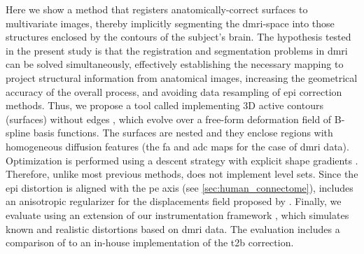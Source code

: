 Here we show a method that registers anatomically-correct surfaces to multivariate images,
  thereby implicitly segmenting the \gls*{dmri}-space into those structures enclosed by the contours
  of the subject's brain.
The hypothesis tested in the present study is that the registration and segmentation
  problems in \gls*{dmri} can be solved simultaneously, effectively establishing the
  necessary mapping to project structural information from anatomical images, increasing the
  geometrical accuracy of the overall process, and avoiding data resampling of \gls*{epi}
  correction methods.
Thus, we propose a tool called \regseg{} implementing 3D active contours (surfaces) without edges
  \citep{chan_active_2001}, which evolve over a free-form deformation field of B-spline
  basis functions.
The surfaces are nested and they enclose regions with homogeneous diffusion features
  (the \gls*{fa} and \gls*{adc} maps for the case of \gls*{dmri} data).
Optimization is performed using a descent strategy with explicit shape gradients
  \citep{besson_dream2s_2003,herbulot_segmentation_2006}.
Therefore, unlike most previous methods, \regseg{} does not implement level sets.
Since the \gls*{epi} distortion is aligned with the \gls*{pe} axis (see
  \autoref{sec:human_connectome}), \regseg{} includes an anisotropic regularizer for
  the displacements field proposed by \cite{nagel_investigation_1986}.
Finally, we evaluate \regseg{} using an extension of our instrumentation framework
  \citep{esteban_simulationbased_2014}, which simulates known and realistic distortions
  based on \gls*{dmri} data.
The evaluation includes a comparison of \regseg{} to an in-house implementation of
  the \gls*{t2b} correction.

